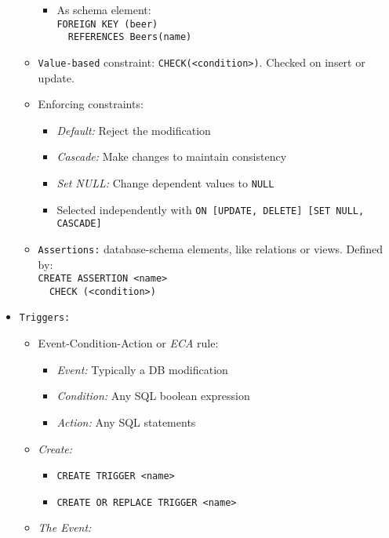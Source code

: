 \documentclass[landscape,8pt]{extarticle}
\newcommand{\code}{\lstinline}
\begin{document}
\begin{multicols}{4}
\begin{itemize}
\begin{itemize}
\begin{itemize}
            \item As schema element:\\
        \code{FOREIGN KEY (beer)}\\
        \code{  REFERENCES Beers(name)}
        \end{itemize}
        \item \code{Value-based} constraint: \code{CHECK(<condition>)}. Checked on insert or update.
        \item Enforcing constraints:
        \begin{itemize}
            \item \emph{Default:} Reject the modification
            \item \emph{Cascade:} Make changes to maintain consistency
            \item \emph{Set NULL:} Change dependent values to \code{NULL}
            \item Selected independently with \code{ON [UPDATE, DELETE] [SET NULL, CASCADE]}
        \end{itemize}
        \item \code{Assertions:} database-schema elements, like relations or views. Defined by:\\
        \code{CREATE ASSERTION <name>} \\
        \code{  CHECK (<condition>)}
    \end{itemize}
    \item \code{Triggers:}
    \begin{itemize}
        \item Event-Condition-Action or \emph{ECA} rule:
        \begin{itemize}
            \item \emph{Event:} Typically a DB modification
            \item \emph{Condition:} Any SQL boolean expression
            \item \emph{Action:} Any SQL statements
        \end{itemize}
        \item \emph{Create:}
        \begin{itemize}
            \item \code{CREATE TRIGGER <name>}
            \item \code{CREATE OR REPLACE TRIGGER <name>}
        \end{itemize}
        \item \emph{The Event:}
        \begin{itemize}

\end{itemize}
\end{itemize}
\end{itemize}
\end{multicols}
\end{document}
